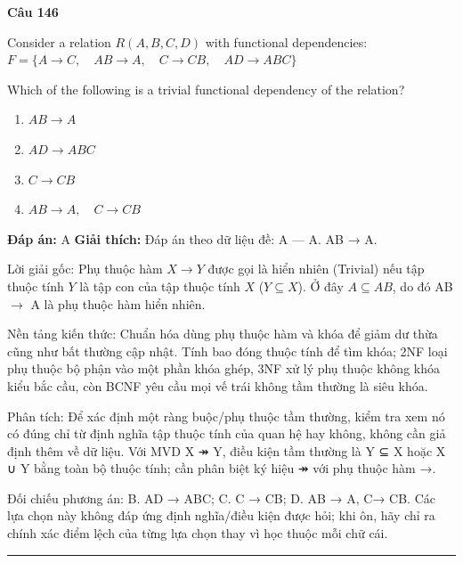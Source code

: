 \documentclass[11pt,a4paper]{article}
\newenvironment{question}[1]{%
  \par\vspace{1em}\noindent\textbf{\large Câu #1}\par\vspace{0.4em}
}{%
  \par\vspace{1em}\hrule\vspace{0.6em}
}
\newenvironment{choices}{%
  \begin{enumerate}[label=\textbf{\Alph*.},leftmargin=2.2em,itemsep=2pt,topsep=3pt]
}{%
  \end{enumerate}
}
\newcommand{\choice}{\item}
\begin{document}
\begin{question}{146}
Consider a relation \(R(A, B, C, D)\) with functional dependencies:
\(F = \{ A \rightarrow C, \quad AB \rightarrow A, \quad C \rightarrow CB, \quad AD \rightarrow ABC \}\)

Which of the following is a trivial functional dependency of the relation?
\begin{choices}
\choice \(AB \rightarrow A\)
\choice \(AD \rightarrow ABC\)
\choice \(C \rightarrow CB\)
\choice \(AB \rightarrow A, \quad C \rightarrow CB\)
\end{choices}
\textbf{Đáp án:} A
\textbf{Giải thích:} Đáp án theo dữ liệu đề: A — A. AB → A.

Lời giải gốc: Phụ thuộc hàm $X \rightarrow Y$ được gọi là hiển nhiên (Trivial) nếu tập thuộc tính $Y$ là tập con của tập thuộc tính $X$ ($Y \subseteq X$). Ở đây $A \subseteq AB$, do đó AB $\rightarrow$ A là phụ thuộc hàm hiển nhiên.

Nền tảng kiến thức: Chuẩn hóa dùng phụ thuộc hàm và khóa để giảm dư thừa cũng như bất thường cập nhật. Tính bao đóng thuộc tính để tìm khóa; 2NF loại phụ thuộc bộ phận vào một phần khóa ghép, 3NF xử lý phụ thuộc không khóa kiểu bắc cầu, còn BCNF yêu cầu mọi vế trái không tầm thường là siêu khóa.

Phân tích: Để xác định một ràng buộc/phụ thuộc tầm thường, kiểm tra xem nó có đúng chỉ từ định nghĩa tập thuộc tính của quan hệ hay không, không cần giả định thêm về dữ liệu. Với MVD X ↠ Y, điều kiện tầm thường là Y ⊆ X hoặc X ∪ Y bằng toàn bộ thuộc tính; cần phân biệt ký hiệu ↠ với phụ thuộc hàm →.

Đối chiếu phương án: B. AD → ABC; C. C → CB; D. AB → A, C→ CB. Các lựa chọn này không đáp ứng định nghĩa/điều kiện được hỏi; khi ôn, hãy chỉ ra chính xác điểm lệch của từng lựa chọn thay vì học thuộc mỗi chữ cái.
\end{question}
\end{document}
